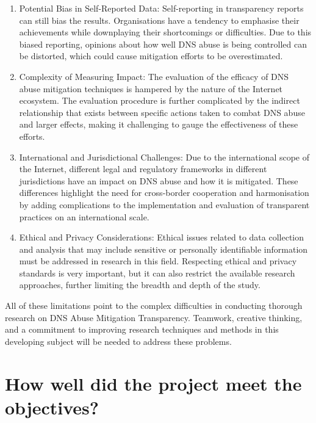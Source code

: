 \begin{enumerate}
    \item Potential Bias in Self-Reported Data: Self-reporting in transparency reports can still bias the results. Organisations have a tendency to emphasise their achievements while downplaying their shortcomings or difficulties. Due to this biased reporting, opinions about how well DNS abuse is being controlled can be distorted, which could cause mitigation efforts to be overestimated.
    
    \item Complexity of Measuring Impact: The evaluation of the efficacy of DNS abuse mitigation techniques is hampered by the nature of the Internet ecosystem. The evaluation procedure is further complicated by the indirect relationship that exists between specific actions taken to combat DNS abuse and larger effects, making it challenging to gauge the effectiveness of these efforts.

    \item International and Jurisdictional Challenges: Due to the international scope of the Internet, different legal and regulatory frameworks in different jurisdictions have an impact on DNS abuse and how it is mitigated. These differences highlight the need for cross-border cooperation and harmonisation by adding complications to the implementation and evaluation of transparent practices on an international scale.

    \item Ethical and Privacy Considerations: Ethical issues related to data collection and analysis that may include sensitive or personally identifiable information must be addressed in research in this field. Respecting ethical and privacy standards is very important, but it can also restrict the available research approaches, further limiting the breadth and depth of the study.

    
  
\end{enumerate}

All of these limitations point to the complex difficulties in conducting thorough research on DNS Abuse Mitigation Transparency. Teamwork, creative thinking, and a commitment to improving research techniques and methods in this developing subject will be needed to address these problems.

\section{How well did the project meet the objectives?}

